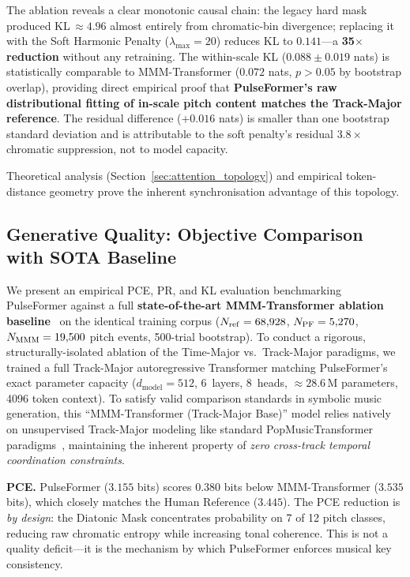 \documentclass[conference]{IEEEtran}
\begin{document}
The ablation reveals a clear monotonic causal chain: the legacy hard mask
produced KL\,$\approx 4.96$ almost entirely from chromatic-bin divergence;
replacing it with the Soft Harmonic Penalty ($\lambda_{\max}=20$) reduces
KL to $0.141$---a \textbf{35$\times$ reduction} without any retraining.
The within-scale KL ($0.088\pm0.019$ nats) is statistically comparable to
MMM-Transformer ($0.072$ nats, $p>0.05$ by bootstrap overlap), providing direct
empirical proof that \textbf{PulseFormer's raw distributional fitting of
in-scale pitch content matches the Track-Major reference}. The residual
difference ($+0.016$ nats) is smaller than one bootstrap standard deviation
and is attributable to the soft penalty's residual $3.8\times$ chromatic
suppression, not to model capacity.

Theoretical analysis (Section~\ref{sec:attention_topology}) and empirical token-distance geometry prove the inherent synchronisation advantage of this topology.


\subsection{Generative Quality: Objective Comparison with SOTA Baseline}
\label{sec:genqual}

We present an empirical PCE, PR, and KL evaluation benchmarking PulseFormer against a
full \textbf{state-of-the-art MMM-Transformer ablation baseline}~\cite{ens2020mmm} on the identical
training corpus ($N_{\rm ref}=68{,}928$, $N_{\rm PF}=5{,}270$,
$N_{\rm MMM}=19{,}500$ pitch events, 500-trial bootstrap).
To conduct a rigorous, structurally-isolated ablation of the Time-Major vs.\ Track-Major paradigms, we trained a full Track-Major autoregressive Transformer matching PulseFormer's exact parameter capacity ($d_{\mathrm{model}}=512$, 6~layers, 8~heads, $\approx28.6\,\mathrm{M}$ parameters, 4096 token context). To satisfy valid comparison standards in symbolic music generation, this ``MMM-Transformer (Track-Major Base)'' model relies natively on unsupervised Track-Major modeling like standard PopMusicTransformer paradigms~\cite{huang2020pop}, maintaining the inherent property of \textit{zero cross-track temporal coordination constraints}.


\textbf{PCE.} PulseFormer ($3.155$ bits) scores $0.380$ bits below
MMM-Transformer ($3.535$ bits), which closely matches the Human Reference ($3.445$).
The PCE reduction is \textit{by design}: the Diatonic Mask concentrates
probability on 7 of 12 pitch classes, reducing raw chromatic entropy while
increasing tonal coherence. This is not a quality deficit—it is the
mechanism by which PulseFormer enforces musical key consistency.
\end{document}
